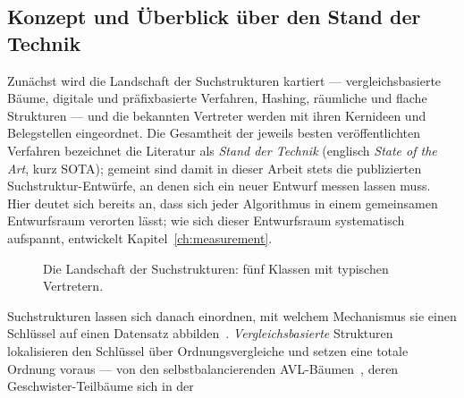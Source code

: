 \begin{nurlang}
\section{Konzept und Überblick über den Stand der Technik}\label{sec:overview}
Zunächst wird die Landschaft der Suchstrukturen kartiert --- vergleichsbasierte Bäume, digitale und
präfixbasierte Verfahren, Hashing, räumliche und flache Strukturen --- und die bekannten Vertreter
werden mit ihren Kernideen und Belegstellen eingeordnet. Die Gesamtheit der jeweils besten veröffentlichten Verfahren
bezeichnet die Literatur als \emph{Stand der Technik} (englisch \emph{State of the Art}, kurz SOTA);
gemeint sind damit in dieser Arbeit stets die publizierten Suchstruktur-Entwürfe, an denen sich ein
neuer Entwurf messen lassen muss. Hier deutet sich bereits an, dass sich jeder Algorithmus in einem
gemeinsamen Entwurfsraum verorten lässt; wie sich dieser Entwurfsraum systematisch aufspannt, entwickelt
Kapitel~\ref{ch:measurement}.
\begin{figure}[htbp]\centering
{}
\caption{Die Landschaft der Suchstrukturen: fünf Klassen mit typischen Vertretern.}\label{fig:search-map}
\end{figure}
Suchstrukturen lassen sich danach einordnen, mit welchem Mechanismus sie einen Schlüssel auf einen
Datensatz abbilden~\cite{knuth1998taocp3}\@. \emph{Vergleichsbasierte} Strukturen lokalisieren den
Schlüssel über Ordnungsvergleiche und setzen eine totale Ordnung voraus --- von den
selbstbalancierenden AVL-Bäumen~\cite{adelsonvelsky1962avl}, deren Geschwister-Teilbäume sich in der

\end{nurlang}
